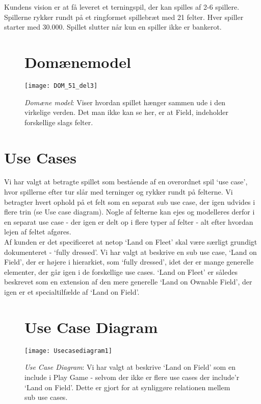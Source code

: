 Kundens vision er at få leveret et terningspil, der kan spilles af 2-6 spillere.
Spillerne rykker rundt på et ringformet spillebræt med 21 felter. Hver spiller
starter med 30.000. Spillet slutter når kun en spiller ikke er bankerot.\\
\FloatBarrier
\begin{figure}[h]
\section*{Domænemodel}
\centering
\noindent \texttt{[image: DOM\_51\_del3]}
\caption{\emph{Domæne model}: Viser hvordan spillet hænger sammen ude i den
virkelige verden. Det man ikke kan se her, er at Field, indeholder forskellige slags
felter.}
\end{figure}
\FloatBarrier
\section*{Use Cases}
Vi har valgt at betragte spillet som bestående af en overordnet spil ‘use case’,
hvor spillerne efter tur slår med terninger og rykker rundt på felterne. Vi
betragter hvert ophold på et felt som en separat sub use case, der igen udvides
i flere trin (se Use case diagram). Nogle af felterne kan ejes og modelleres
derfor i en separat use case - der igen er delt op i flere typer af felter - alt
efter hvordan lejen af feltet afgøres.\\
\indent Af kunden er det specificeret at netop ‘Land on Fleet’ skal være særligt
grundigt dokumenteret - ‘fully dressed’. Vi har valgt at beskrive en sub use
case, ‘Land on Field’, der er højere i hierarkiet, som ‘fully dressed’, idet der
er mange generelle elementer, der går igen i de forskellige use cases. ‘Land on
Fleet’ er således beskrevet som en extension af den mere generelle ‘Land on
Ownable Field’, der igen er et specialtilfælde af ‘Land on Field’.\\
\FloatBarrier
\begin{figure}[h]
\section*{Use Case Diagram}
\centering
\noindent \texttt{[image: Usecasediagram1]}
\caption{\emph{Use Case Diagram}: Vi har valgt at beskrive ‘Land on Field’ som
en include i Play Game - selvom der ikke er flere use cases der include’r ‘Land on
Field’. Dette er gjort for at synliggøre relationen mellem sub use cases.}
\end{figure}
\FloatBarrier
